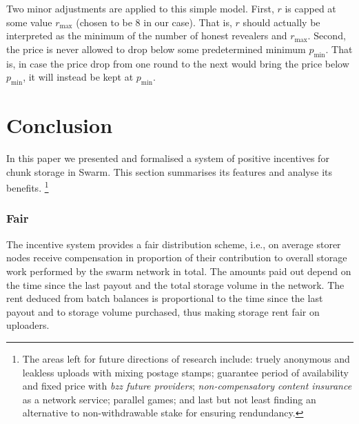 Two minor adjustments are applied to this simple model. First, $r$ is capped at some value $r_{\text{max}}$ (chosen to be 8 in our case). That is, $r$ should actually be interpreted as the minimum of the number of honest revealers and $r_{\text{max}}$. Second, the price is never allowed to drop below some predetermined minimum $p_{\text{min}}$. That is, in case the price drop from one round to the next would bring the price below $p_{\text{min}}$, it will instead be kept at $p_{\text{min}}$. 



\section{Conclusion}



In this paper we presented and formalised a system of positive incentives for chunk storage in Swarm. This section summarises its features and analyse its benefits.%
%
\footnote{The areas left for future directions of research include: truely anonymous and leakless uploads with mixing postage stamps; guarantee period of availability and fixed price with \emph{bzz future providers}; \emph{non-compensatory content insurance} as a network service; parallel games; and last but not least finding an alternative to non-withdrawable stake for ensuring rendundancy.}

\subsubsection{Fair}                                           
The incentive system provides a fair distribution scheme, i.e., on average storer nodes receive compensation in proportion of their contribution to overall storage work performed by the swarm network in total. The amounts paid out depend on the time since the last payout and the total storage volume in the network.
The rent deduced from batch balances is proportional to the time since the last payout and to  storage volume purchased, 
thus making storage rent fair on uploaders. 
                



